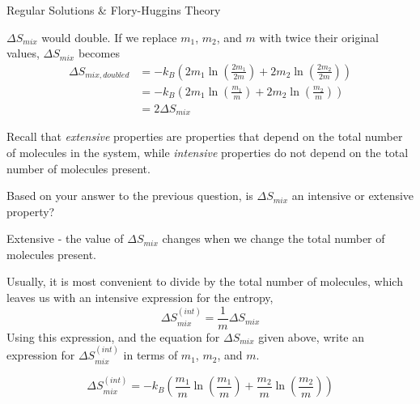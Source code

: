 \begin{activity}{Regular Solutions \& Flory-Huggins Theory}
\begin{ctqs}
\begin{solution}[1in]
			$\Delta S_{mix}$ would double.  If we replace $m_1$, $m_2$, and $m$ with twice their original values, $\Delta S_{mix}$ becomes
			\vspace{-6pt}
			\begin{align*}
				\Delta S_{mix,doubled} &= -k_B\left(2m_1 \ln\left(\frac{2m_1}{2m}\right) + 2m_2 \ln\left(\frac{2m_2}{2m}\right) \right)\\
				 &= -k_B\left(2m_1 \ln\left(\frac{m_1}{m}\right) + 2m_2 \ln\left(\frac{m_2}{m}\right) \right)\\
				 &= 2\Delta S_{mix}
			\end{align*}
		\end{solution}
	
	
	\question Recall that \emph{extensive} properties are properties that depend on the total number of molecules in the system, while \emph{intensive} properties do not depend on the total number of molecules present.
	
	Based on your answer to the previous question, is $\Delta S_{mix}$ an intensive or extensive property?
	
		\begin{solution}[0.5in]
		
			Extensive - the value of $\Delta S_{mix}$ changes when we change the total number of molecules present.
		
		\end{solution}
	
	\question Usually, it is most convenient to divide by the total number of molecules, which leaves us with an intensive expression for the entropy, 
		\begin{equation*}
			\Delta S_{mix}^{(int)} = \frac{1}{m} \Delta S_{mix}
		\end{equation*}
		Using this expression, and the equation for $\Delta S_{mix}$ given above, write an expression for $\Delta S_{mix}^{(int)}$ in terms of $m_1$, $m_2$, and $m$.
		
			\begin{solution}[0.75in]
			
				\begin{equation*}
					\Delta S_{mix}^{(int)} = -k_B\left(\frac{m_1}{m} \ln\left(\frac{m_1}{m}\right) + \frac{m_2}{m} \ln\left(\frac{m_2}{m}\right) \right)
				\end{equation*}
			\end{solution}
		

\end{ctqs}
\end{activity}
